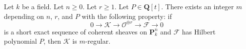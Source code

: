 %
\begin{lemma}
\label{lemma-bound-quotients-free}
Let $k$ be a field. Let $n \geq 0$. Let $r \geq 1$. Let $P \in \mathbf{Q}[t]$.
There exists an integer $m$ depending on $n$, $r$, and $P$
with the following property: if
$$
0 \to \mathcal{K} \to \mathcal{O}^{\oplus r} \to \mathcal{F} \to 0
$$
is a short exact sequence of coherent sheaves on $\mathbf{P}^n_k$
and $\mathcal{F}$ has Hilbert polynomial $P$, then
$\mathcal{K}$ is $m$-regular.
\end{lemma}

